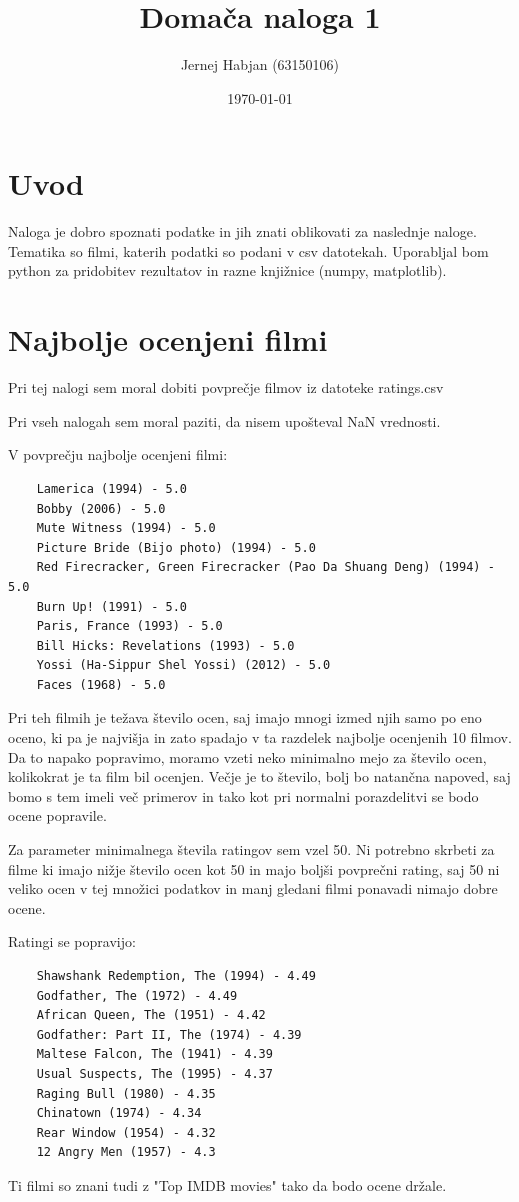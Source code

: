 \documentclass[a4paper,11pt]{article}
\title{Domača naloga 1}
\author{Jernej Habjan (63150106)}
\date{\today}
\begin{document}
	
	\maketitle
	
	\section{Uvod}
	
	Naloga je dobro spoznati podatke in jih znati oblikovati za naslednje naloge. Tematika so filmi, katerih podatki so podani v csv datotekah. Uporabljal bom python za pridobitev rezultatov in razne knjižnice (numpy, matplotlib). 
	
	\section{Najbolje ocenjeni filmi}
	Pri tej nalogi sem moral dobiti povprečje filmov iz datoteke ratings.csv
	
	Pri vseh nalogah sem moral paziti, da nisem upošteval NaN vrednosti.
	
	V povprečju najbolje ocenjeni filmi:\\
	\begin{lstlisting}
	Lamerica (1994) - 5.0
	Bobby (2006) - 5.0
	Mute Witness (1994) - 5.0
	Picture Bride (Bijo photo) (1994) - 5.0
	Red Firecracker, Green Firecracker (Pao Da Shuang Deng) (1994) - 5.0
	Burn Up! (1991) - 5.0
	Paris, France (1993) - 5.0
	Bill Hicks: Revelations (1993) - 5.0
	Yossi (Ha-Sippur Shel Yossi) (2012) - 5.0
	Faces (1968) - 5.0
	\end{lstlisting}
	Pri teh filmih je težava število ocen, saj imajo mnogi izmed njih samo po eno oceno, ki pa je najvišja in zato spadajo v ta razdelek najbolje ocenjenih 10 filmov.
	Da to napako popravimo, moramo vzeti neko minimalno mejo za število ocen, kolikokrat je ta film bil ocenjen. Večje je to število, bolj bo natančna napoved, saj bomo s tem imeli več primerov in tako kot pri normalni porazdelitvi se bodo ocene popravile.
	
	Za parameter minimalnega števila ratingov sem vzel 50. Ni potrebno skrbeti za filme ki imajo nižje število ocen kot 50 in majo boljši povprečni rating, saj 50 ni veliko ocen v tej množici podatkov in manj gledani filmi ponavadi nimajo dobre ocene.
	
	Ratingi se popravijo:\\
	\begin{lstlisting}
	Shawshank Redemption, The (1994) - 4.49
	Godfather, The (1972) - 4.49
	African Queen, The (1951) - 4.42
	Godfather: Part II, The (1974) - 4.39
	Maltese Falcon, The (1941) - 4.39
	Usual Suspects, The (1995) - 4.37
	Raging Bull (1980) - 4.35
	Chinatown (1974) - 4.34
	Rear Window (1954) - 4.32
	12 Angry Men (1957) - 4.3
	\end{lstlisting}
	Ti filmi so znani tudi z "Top IMDB movies" tako da bodo ocene držale.
\end{document}
